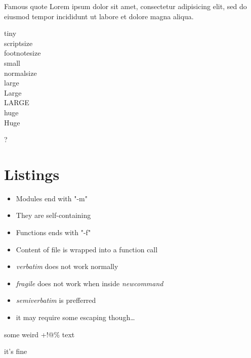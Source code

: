 {
\begin{block}{Famous quote}
Lorem ipsum dolor sit amet, consectetur adipisicing elit, sed do eiusmod tempor incididunt ut labore et dolore magna aliqua.
\end{block}
}


{
\tiny{tiny} \\
\scriptsize{scriptsize} \\
\footnotesize{footnotesize} \\
\small{small} \\
\normalsize{normalsize} \\
\large{large} \\
\Large{Large} \\
\LARGE{LARGE} \\
\huge{huge} \\
\Huge{Huge}
}


{
\begin{center}
\vspace{-10em}
\fontsize{160}{200}\selectfont ?
\end{center}
}


\section{Listings}


{
\begin{itemize}
\item Modules end with "-m"
\item They are self-containing
\end{itemize}

}


{
\begin{itemize}
\item Functions ends with "-f"
\item Content of file is wrapped into a function call
\end{itemize}

}


{
\tiny{}
\begin{multicols}{2}

\end{multicols}
}


{
\begin{itemize}
\item \emph{verbatim} does not work normally
\item \emph{fragile} does not work when inside \emph{newcommand}
\item \emph{semiverbatim} is prefferred
\item it may require some escaping though\ldots
\end{itemize}
\begin{semiverbatim}
some weird +!@\% text

it's fine \
\end{semiverbatim}
}


